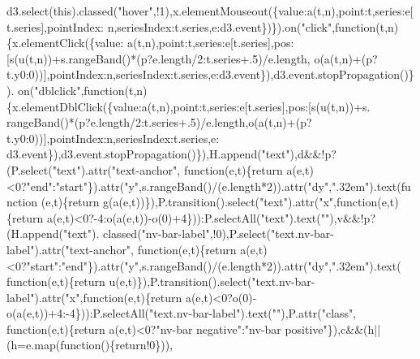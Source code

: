 \begin{DoxyCode}
      d3.select(\textcolor{keyword}{this}).classed(\textcolor{stringliteral}{"hover"},!1),x.elementMouseout(\{value:a(t,n),point:t,series:e[t.series],pointIndex:
      n,seriesIndex:t.series,e:d3.event\})\}).on(\textcolor{stringliteral}{"click"},\textcolor{keyword}{function}(t,n)\{x.elementClick(\{value:
      a(t,n),point:t,series:e[t.series],pos:[s(u(t,n))+s.rangeBand()*(p?e.length/2:t.series+.5)/e.length,
      o(a(t,n)+(p?t.y0:0))],pointIndex:n,seriesIndex:t.series,e:d3.event\}),d3.event.stopPropagation()\}).
      on(\textcolor{stringliteral}{"dblclick"},\textcolor{keyword}{function}(t,n)\{x.elementDblClick(\{value:a(t,n),point:t,series:e[t.series],pos:[s(u(t,n))+s.
      rangeBand()*(p?e.length/2:t.series+.5)/e.length,o(a(t,n)+(p?t.y0:0))],pointIndex:n,seriesIndex:t.series,e:
      d3.event\}),d3.event.stopPropagation()\}),H.append(\textcolor{stringliteral}{"text"}),d&&!p?(P.select(\textcolor{stringliteral}{"text"}).attr(\textcolor{stringliteral}{"text-anchor"},\textcolor{keyword}{
      function}(e,t)\{\textcolor{keywordflow}{return} a(e,t)<0?\textcolor{stringliteral}{"end"}:\textcolor{stringliteral}{"start"}\}).attr(\textcolor{stringliteral}{"y"},s.rangeBand()/(e.length*2)).attr(\textcolor{stringliteral}{"dy"},\textcolor{stringliteral}{".32em"}).text(\textcolor{keyword}{function}
      (e,t)\{\textcolor{keywordflow}{return} g(a(e,t))\}),P.transition().select(\textcolor{stringliteral}{"text"}).attr(\textcolor{stringliteral}{"x"},\textcolor{keyword}{function}(e,t)\{\textcolor{keywordflow}{return} 
      a(e,t)<0?-4:o(a(e,t))-o(0)+4\})):P.selectAll(\textcolor{stringliteral}{"text"}).text(\textcolor{stringliteral}{""}),v&&!p?(H.append(\textcolor{stringliteral}{"text"}).
      classed(\textcolor{stringliteral}{"nv-bar-label"},!0),P.select(\textcolor{stringliteral}{"text.nv-bar-label"}).attr(\textcolor{stringliteral}{"text-anchor"},
      function(e,t)\{\textcolor{keywordflow}{return} a(e,t)<0?\textcolor{stringliteral}{"start"}:\textcolor{stringliteral}{"end"}\}).attr(\textcolor{stringliteral}{"y"},s.rangeBand()/(e.length*2)).attr(\textcolor{stringliteral}{"dy"},\textcolor{stringliteral}{".32em"}).text(\textcolor{keyword}{
      function}(e,t)\{\textcolor{keywordflow}{return} u(e,t)\}),P.transition().select(\textcolor{stringliteral}{"text.nv-bar-label"}).attr(\textcolor{stringliteral}{"x"},\textcolor{keyword}{function}(e,t)\{\textcolor{keywordflow}{return} 
      a(e,t)<0?o(0)-o(a(e,t))+4:-4\})):P.selectAll(\textcolor{stringliteral}{"text.nv-bar-label"}).text(\textcolor{stringliteral}{""}),P.attr(\textcolor{stringliteral}{"class"},
      function(e,t)\{\textcolor{keywordflow}{return} a(e,t)<0?\textcolor{stringliteral}{"nv-bar negative"}:\textcolor{stringliteral}{"nv-bar positive"}\}),c&&(h||(h=e.map(\textcolor{keyword}{function}()\{return!0\})),

\end{DoxyCode}
